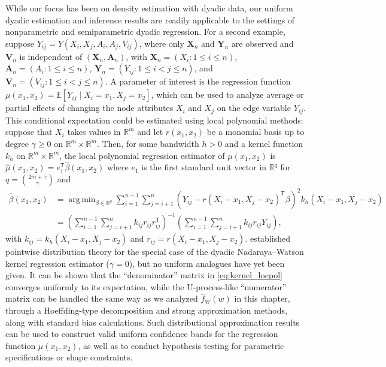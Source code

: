 \documentclass[11pt,lof]{puthesis}
\newcommand{\R}{\ensuremath{\mathbb{R}}}
\newcommand{\E}{\ensuremath{\mathbb{E}}}
\newcommand{\bY}{\ensuremath{\mathbf{Y}}}
\newcommand{\bX}{\ensuremath{\mathbf{X}}}
\newcommand{\bA}{\ensuremath{\mathbf{A}}}
\newcommand{\bV}{\ensuremath{\mathbf{V}}}
\newcommand{\T}{\ensuremath{\mathsf{T}}}
\DeclareMathOperator*{\argmin}{arg\,min}
\theoremstyle{break}
\theoremstyle{proof}
\begin{document}
While our focus has been on density estimation with dyadic data,
our uniform dyadic estimation and inference results are readily applicable
to the settings of nonparametric and semiparametric dyadic regression.
For a second example, suppose $Y_{i j} = Y(X_i, X_j, A_i, A_j, V_{i j})$,
where only $\bX_n$ and $\bY_n$ are observed and
$\bV_n$ is independent of $(\bX_n, \bA_n)$,
with $\bX_n = (X_i : 1 \leq i \leq n)$,
$\bA_n = (A_i : 1 \leq i \leq n)$, $\bY_n = (Y_{i j}:1\leq i<j\leq n)$,
and $\bV_n = (V_{i j} : 1 \leq i < j \leq n)$.
A parameter of interest is the regression function
$\mu(x_1, x_2) = \E[Y_{i j} \mid X_i=x_1, X_j=x_2]$,
which can be used to analyze average or partial effects
of changing the node attributes $X_i$ and $X_j$ on the edge variable $Y_{i j}$.
This conditional expectation could be estimated using local polynomial methods:
suppose that $X_i$ takes values in $\R^m$ and
let $r(x_1, x_2)$ be a monomial basis up to degree
$\gamma \geq 0$ on $\R^m \times \R^m$. Then, for some bandwidth $h > 0$ and
a kernel function $k_h$ on $\R^m \times \R^m$,
the local polynomial regression estimator of $\mu(x_1, x_2)$ is
$\hat\mu(x_1, x_2) = e_1^\T \hat\beta(x_1, x_2)$ where
$e_1$ is the first standard unit vector in $\R^q$ for
$q=\binom{2m+\gamma}{\gamma}$ and
%
\begin{align}
  \nonumber
  \hat{\beta}(x_1, x_2)
  &=
  \argmin_{\beta \in \R^q}
  \sum_{i=1}^{n-1} \sum_{j=i+1}^n
  \left( Y_{i j} - r(X_i-x_1, X_j-x_2)^\T \beta \right)^2
  k_h(X_i-x_1, X_j-x_2) \\
  \label{eq:kernel_locpol}
  &=
  \left(
    \sum_{i=1}^{n-1} \sum_{j=i+1}^n k_{i j} r_{i j} r_{i j}^\T
  \right)^{-1}
  \left(
    \sum_{i=1}^{n-1} \sum_{j=i+1}^n k_{i j} r_{i j} Y_{i j}
  \right),
\end{align}
%
with $k_{i j} = k_h(X_i-x_1, X_j-x_2)$ and $r_{i j} = r(X_i-x_1, X_j-x_2)$.
\citet{graham2021minimax} established pointwise distribution theory
for the special case of the dyadic Nadaraya--Watson kernel regression estimator
($\gamma=0$), but no uniform analogues have yet been given. It can be shown
that the ``denominator'' matrix in \eqref{eq:kernel_locpol} converges uniformly
to its
expectation, while the U-process-like ``numerator'' matrix can be handled the
same way as we analyzed $\hat f_W(w)$ in this chapter, through a Hoeffding-type
decomposition and strong approximation methods, along with standard bias
calculations. Such distributional approximation results can be used to
construct valid uniform confidence bands for the regression function
$\mu(x_1, x_2)$, as well as to conduct hypothesis testing for parametric
specifications or shape constraints.
\end{document}
